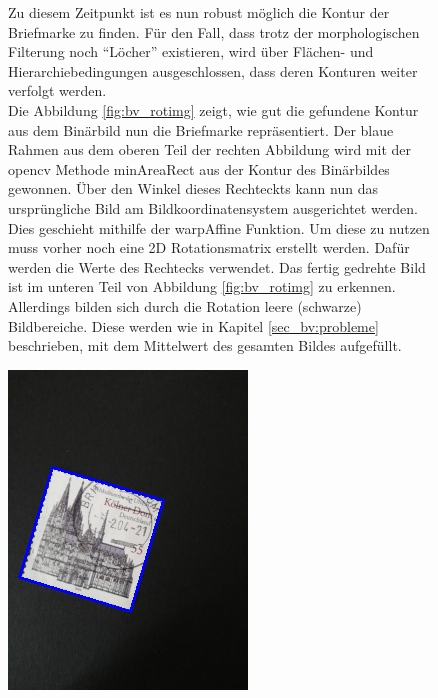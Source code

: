 \documentclass[12pt,toc=bib,toc=listof]{scrreprt}
\begin{document}
\begin{figure}[h]
\begin{minipage}[t]{.75\linewidth}
Zu diesem Zeitpunkt ist es nun robust möglich die Kontur der Briefmarke zu finden. Für den Fall, dass trotz der morphologischen Filterung noch ``Löcher'' existieren, wird über Flächen- und Hierarchiebedingungen ausgeschlossen, dass deren Konturen weiter verfolgt werden. \\Die Abbildung \ref{fig:bv_rotimg} zeigt, wie gut die gefundene Kontur aus dem Binärbild nun die Briefmarke repräsentiert. Der blaue Rahmen aus dem oberen Teil der rechten Abbildung wird mit der opencv Methode minAreaRect aus der Kontur des Binärbildes gewonnen. Über den Winkel dieses Rechteckts kann nun das ursprüngliche Bild am Bildkoordinatensystem ausgerichtet werden. Dies geschieht mithilfe der warpAffine Funktion. Um diese zu nutzen muss vorher noch eine 2D Rotationsmatrix erstellt werden. Dafür werden die Werte des Rechtecks verwendet. Das fertig gedrehte Bild ist im unteren Teil von Abbildung \ref{fig:bv_rotimg} zu erkennen. Allerdings bilden sich durch die Rotation leere (schwarze) Bildbereiche. Diese werden wie in Kapitel \ref{sec_bv:probleme} beschrieben, mit dem Mittelwert des gesamten Bildes aufgefüllt.
\end{minipage}
\hfill
\begin{minipage}[t]{.2\linewidth}
  \strut\vspace*{-\baselineskip}\newline\includegraphics[width=\linewidth]{./../bilder/minarearect_dom}

\end{minipage}
\end{figure}
\end{document}
